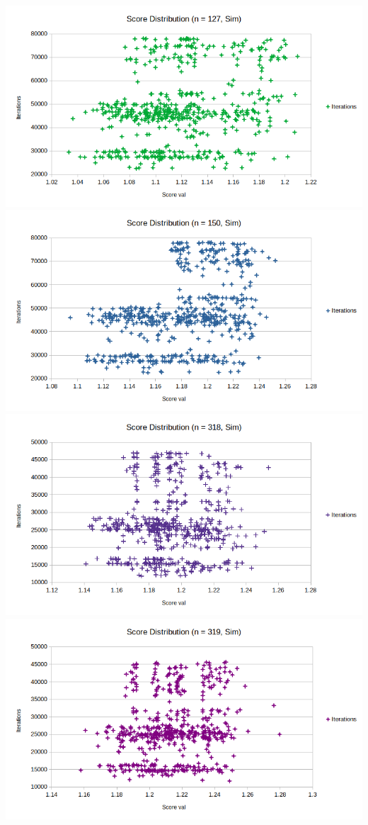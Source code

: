 \documentclass{article}
\begin{document}
\includegraphics[scale=0.36]{simDist127}
\includegraphics[scale=0.36]{simDist150}
\includegraphics[scale=0.36]{simDist318}
\includegraphics[scale=0.36]{simDist319}
\end{document}
